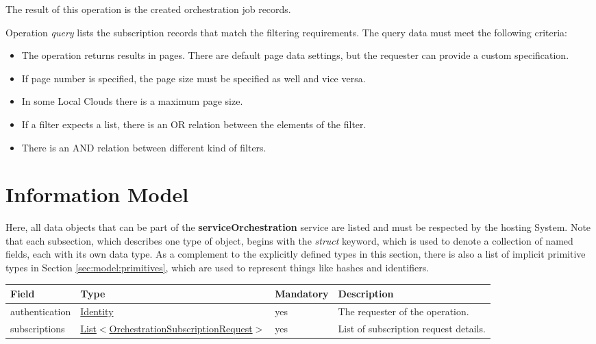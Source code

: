 \documentclass[a4paper]{arrowhead}
\newcommand{\pref}[1]{{\textcolor{ArrowheadGrey}{\hyperref[sec:model:primitives:#1]{#1}}}}
\begin{document}
The result of this operation is the created orchestration job records.


Operation \textit{query} lists the subscription records that match the filtering requirements. The query data must meet the following criteria:

\begin{itemize}
    \item The operation returns results in pages. There are default page data settings, but the requester can provide a custom specification.
    \item If page number is specified, the page size must be specified as well and vice versa.
    \item In some Local Clouds there is a maximum page size.
    \item If a filter expects a list, there is an OR relation between the elements of the filter.
    \item There is an AND relation between different kind of filters.
\end{itemize}

\clearpage

\section{Information Model}
\label{sec:model}

Here, all data objects that can be part of the \textbf{serviceOrchestration} service are listed and must be respected by the hosting System.
Note that each subsection, which describes one type of object, begins with the \textit{struct} keyword, which is used to denote a collection of named fields, each with its own data type.
As a complement to the explicitly defined types in this section, there is also a list of implicit primitive types in Section \ref{sec:model:primitives}, which are used to represent things like hashes and identifiers.

{}

\begin{table}[ht!]
\begin{tabularx}{\textwidth}{| p{2.5cm} | p{6.3cm} | p{2cm} | X |} \hline
\rowcolor{gray!33} Field & Type & Mandatory & Description \\ \hline
authentication & \hyperref[sec:model:Identity]{Identity} & yes & The requester of the operation. \\ \hline
subscriptions &  \pref{List}$<$\hyperref[sec:model:OrchestrationSubscriptionRequest]{OrchestrationSubscriptionRequest}$>$ & yes & List of subscription request details. \\ \hline
\end{tabularx}
\end{table}
\end{document}
